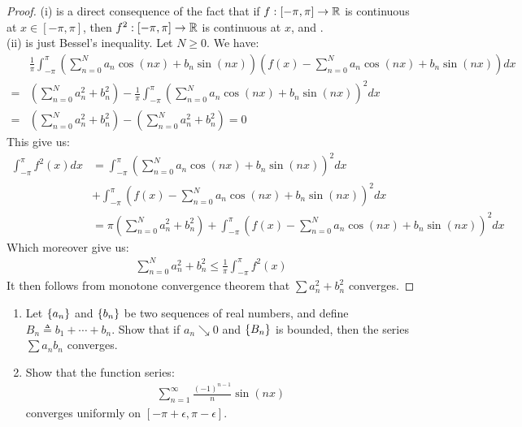 \documentclass{report}
\begin{document}
\begin{proof}
  (i) is a direct consequence of the fact that if $f:[-\pi ,\pi ]\rightarrow \mathbb{R}$ is continuous at $x\in [-\pi ,\pi ]$, then $f^2:[-\pi ,\pi ]\rightarrow \mathbb{R}$ is continuous at $x$, and .  \\

(ii) is just Bessel's inequality. Let $N\geq 0$. We have: 
\begin{align*}
&\frac{1}{\pi }\int_{-\pi }^{\pi } \left(\sum_{n=0}^N a_n \cos (nx)+ b_n \sin (nx)  \right) \left(f(x) - \sum_{n=0}^N a_n\cos (nx)+b_n \sin (nx)  \right) dx \\
  =& \left(\sum_{n=0}^N a_n^2 + b_n^2\right) - \frac{1}{\pi } \int_{-\pi}^{\pi } \left(\sum_{n=0}^N a_n \cos (nx)+ b_n \sin (nx)     \right)^2 dx \\
  =&   \left(\sum_{n=0}^N a_n^2 + b_n^2\right)  -  \left(\sum_{n=0}^N a_n^2 + b_n^2\right) =0 
\end{align*}
This give us: 
\begin{align*}
  \int_{-\pi }^{\pi } f^2(x)dx&= \int_{-\pi }^{\pi }  \left(\sum_{n=0}^N a_n\cos (nx) + b_n \sin (nx)\right)^2 dx \\
  & + \int_{-\pi }^\pi    \left(f(x) - \sum_{n=0}^N a_n\cos (nx)+b_n \sin (nx)  \right)^2 dx \\
  &= \pi  \left(\sum_{n=0}^N a_n^2 +b_n^2 \right) +   \int_{-\pi }^\pi    \left(f(x) - \sum_{n=0}^N a_n\cos (nx)+b_n \sin (nx)  \right)^2 dx 
\end{align*}
Which moreover give us: 
\begin{align*}
\sum_{n=0}^N a_n^2 + b_n^2 \leq \frac{1}{\pi } \int_{-\pi }^{\pi }f^2(x)
\end{align*}
It then follows from monotone convergence theorem that $\sum a_n^2+b_n^2$ converges. 
\end{proof}
\begin{question}{}{}
\begin{enumerate}[label=(\roman*)]
  \item Let $\left\{ a_n \right\}$ and $\left\{ b_n \right\}$ be two sequences of real numbers, and define $B_n\triangleq b_1 + \cdots +b_n$. Show that if $a_n\searrow 0$ and  $\left\{ B_n \right\}$ is bounded, then the series $\sum a_nb_n$ converges. 
  \item Show that the function series: 
    \begin{align*}
    \sum_{n=1}^{\infty} \frac{(-1)^{n-1}}{n} \sin (nx)
    \end{align*}
    converges uniformly on $[-\pi +\epsilon ,\pi -\epsilon ]$. 
\end{enumerate}
\end{question}
\end{document}
